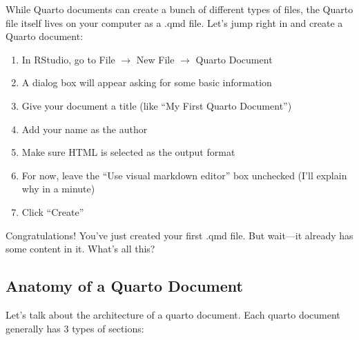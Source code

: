 \documentclass[
  letterpaper,
]{book}
\providecommand{\tightlist}{%
  \setlength{\itemsep}{0pt}\setlength{\parskip}{0pt}}\usepackage{longtable,booktabs,array}
\begin{document}
While Quarto documents can create a bunch of different types of files,
the Quarto file itself lives on your computer as a .qmd file. Let's jump
right in and create a Quarto document:

\begin{enumerate}
\def\labelenumi{\arabic{enumi}.}
\tightlist
\item
  In RStudio, go to File \(\rightarrow\) New File \(\rightarrow\) Quarto
  Document
\item
  A dialog box will appear asking for some basic information
\item
  Give your document a title (like ``My First Quarto Document'')
\item
  Add your name as the author
\item
  Make sure HTML is selected as the output format
\item
  For now, leave the ``Use visual markdown editor'' box unchecked (I'll
  explain why in a minute)
\item
  Click ``Create''
\end{enumerate}

Congratulations! You've just created your first .qmd file. But wait---it
already has some content in it. What's all this?

\subsection{Anatomy of a Quarto
Document}\label{anatomy-of-a-quarto-document}

Let's talk about the architecture of a quarto document. Each quarto
document generally has 3 types of sections:
\end{document}
